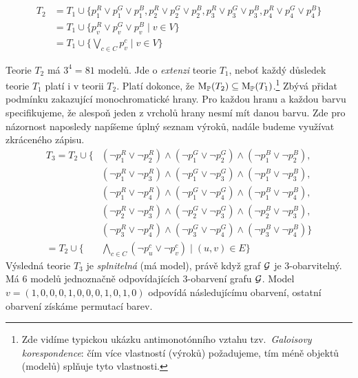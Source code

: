 \begin{align*}
T_2 &= T_1\cup \{p_1^R \lor p_1^G \lor p_1^B, p_2^R \lor p_2^G \lor p_2^B, p_3^R \lor p_3^G \lor p_3^B, p_4^R \lor p_4^G \lor p_4^B\} \\
    &= T_1\cup \{ p_v^R \lor p_v^G \lor p_v^B \mid v \in V \} \\
    &= T_1\cup \{\bigvee_{c\in C} p_v^c \mid v \in V \}  
\end{align*}

Teorie \( T_2 \) má \(3^4=81\) modelů. Jde o \emph{extenzi} teorie \( T_1 \), neboť každý důsledek teorie \( T_1 \) platí i v teorii \( T_2 \). Platí dokonce, že \( \operatorname{M}_\mathbb P(T_2)\subseteq\operatorname{M}_\mathbb P(T_1) \).\footnote{Zde vidíme typickou ukázku antimonotónního vztahu tzv.\ \emph{Galoisovy korespondence}: čím více vlastností (výroků) požadujeme, tím méně objektů (modelů) splňuje tyto vlastnosti.} Zbývá přidat podmínku zakazující monochromatické hrany. Pro každou hranu a každou barvu specifikujeme, že alespoň jeden z vrcholů hrany nesmí mít danou barvu. Zde pro názornost naposledy napíšeme úplný seznam výroků, nadále budeme využívat zkráceného zápisu.
\begin{align*}
    T_3 = T_2\cup \{ & (\neg p_1^R \lor \neg p_2^R) \land (\neg p_1^G \lor \neg p_2^G) \land (\neg p_1^B \lor \neg p_2^B),\\
    & (\neg p_1^R \lor \neg p_3^R) \land (\neg p_1^G \lor \neg p_3^G) \land (\neg p_1^B \lor \neg p_3^B),\\
    & (\neg p_1^R \lor \neg p_4^R) \land (\neg p_1^G \lor \neg p_4^G) \land (\neg p_1^B \lor \neg p_4^B),\\
    & (\neg p_2^R \lor \neg p_3^R) \land (\neg p_2^G \lor \neg p_3^G) \land (\neg p_2^B \lor \neg p_3^B),\\
    & (\neg p_3^R \lor \neg p_4^R) \land (\neg p_3^G \lor \neg p_4^G) \land (\neg p_3^B \lor \neg p_4^B)\} \\  
= T_2\cup \{ &\bigwedge_{c\in C} 
(\neg p_u^c \lor \neg p_v^c) \mid (u,v) \in E \}
\end{align*}
Výsledná teorie \( T_3 \) je \emph{splnitelná} (má model), právě když graf \( \mathcal{G} \) je 3-obarvitelný. Má 6 modelů jednoznačně odpovídajících 3-obarvení grafu \( \mathcal{G} \). Model \( v = (1,0,0,0,1,0,0,0,1,0,1,0) \) odpovídá následujícímu obarvení, ostatní obarvení získáme permutací barev.
\begin{center}
\end{center}

